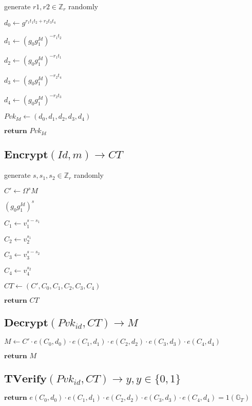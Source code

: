 \documentclass[a4paper]{article}
\begin{document}
generate $r1, r2 \in \mathbb{Z}_r$ randomly

$d_0 \gets g^{r_1 t_1 t_2 + r_2 t_3 t_4}$

$d_1 \gets (g_0 g_1^\textit{Id})^{-  r_1 t_2}$

$d_2 \gets (g_0 g_1^\textit{Id})^{-  r_1 t_1}$

$d_3 \gets (g_0 g_1^\textit{Id})^{-  r_2 t_4}$

$d_4 \gets (g_0 g_1^\textit{Id})^{-  r_2 t_3}$

$\textit{Pvk}_\textit{Id} \gets (d_0, d_1, d_2, d_3, d_4)$

$\textbf{return }\textit{Pvk}_\textit{Id}$

\subsection{$\textbf{Encrypt}(\textit{Id}, m) \rightarrow \textit{CT}$}

generate $s, s_1, s_2 \in \mathbb{Z}_r$ randomly

$C' \gets \Omega^s M$

$(g_0 g_1^\textit{Id})^s$

$C_1 \gets v_1^{s - s_1}$

$C_2 \gets v_2^{s_1}$

$C_3 \gets v_3^{s - s_2}$

$C_4 \gets v_4^{s_2}$

$\textit{CT} \gets (C', C_0, C_1, C_2, C_3, C_4)$

$\textbf{return }\textit{CT}$

\subsection{$\textbf{Decrypt}(\textit{Pvk}_\textit{id}, \textit{CT}) \rightarrow M$}

$M \gets C' \cdot e(C_0, d_0) \cdot e(C_1, d_1) \cdot e(C_2, d_2) \cdot e(C_3, d_3) \cdot e(C_4, d_4)$

$\textbf{return }M$

\subsection{$\textbf{TVerify}(\textit{Pvk}_\textit{id}, \textit{CT}) \rightarrow y, y \in \{0, 1\}$}

$\textbf{return }e(C_0, d_0) \cdot e(C_1, d_1) \cdot e(C_2, d_2) \cdot e(C_3, d_3) \cdot e(C_4, d_4) = 1 (\mathbb{G}_T)$
\end{document}
